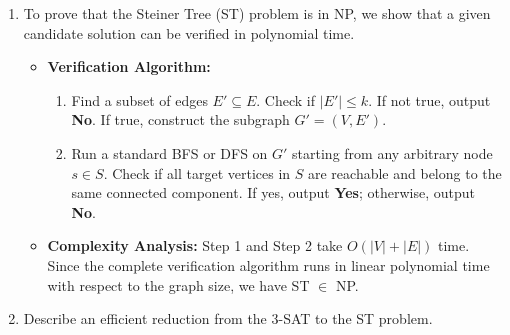 \documentclass[12pt,a4paper]{article}
\makeatletter
\newtheorem*{solution}{Solution}
\theoremstyle{definition}
\renewenvironment{solution}[1][Solution] {\par\pushQED{\qed}\normalfont\topsep6\p@\@plus6\p@\relax\trivlist\item[\hskip\labelsep\bfseries#1\@addpunct{.}]\ignorespaces}{\popQED\endtrivlist\@endpefalse} \makeatother
\makeatother
\begin{document}
\begin{enumerate}
\begin{enumerate}
        \begin{solution}
        To prove that the Steiner Tree (ST) problem is in NP, we show that a given candidate solution can be verified in polynomial time.
        \begin{itemize}
            \item \textbf{Verification Algorithm:}
            \begin{enumerate}
                \item Find a subset of edges $E' \subseteq E$. Check if $|E'| \le k$. If not true, output \textbf{No}. If true, construct the subgraph $G' = (V, E')$.
                \item Run a standard BFS or DFS on $G'$ starting from any arbitrary node $s \in S$. Check if all target vertices in $S$ are reachable and belong to the same connected component. If yes, output \textbf{Yes}; otherwise, output \textbf{No}.
            \end{enumerate}
            \item \textbf{Complexity Analysis:} Step 1 and Step 2 take $O(|V| + |E|)$ time. Since the complete verification algorithm runs in linear polynomial time with respect to the graph size, we have ST $\in$ NP.
        \end{itemize}
        \end{solution}

        \item Describe an efficient reduction from the 3-SAT to the ST problem.
        

\end{enumerate}
\end{enumerate}
\end{document}
